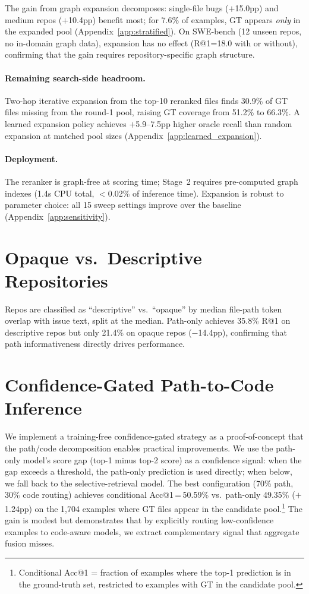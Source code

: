 \documentclass{article}
\begin{document}
The gain from graph expansion decomposes: single-file bugs ($+$15.0pp) and medium repos ($+$10.4pp) benefit most; for 7.6\% of examples, GT appears \emph{only} in the expanded pool (Appendix~\ref{app:stratified}).
On SWE-bench (12 unseen repos, no in-domain graph data), expansion has no effect (R@1=18.0 with or without), confirming that the gain requires repository-specific graph structure.

\paragraph{Remaining search-side headroom.}
Two-hop iterative expansion from the top-10 reranked files finds 30.9\% of GT files missing from the round-1 pool, raising GT coverage from 51.2\% to 66.3\%.
A learned expansion policy achieves $+$5.9--7.5pp higher oracle recall than random expansion at matched pool sizes (Appendix~\ref{app:learned_expansion}).

\paragraph{Deployment.}
The reranker is graph-free at scoring time; Stage~2 requires pre-computed graph indexes (1.4s CPU total, $<$0.02\% of inference time).
Expansion is robust to parameter choice: all 15 sweep settings improve over the baseline (Appendix~\ref{app:sensitivity}).


\section{Opaque vs.\ Descriptive Repositories}
\label{app:opaque_descriptive}

Repos are classified as ``descriptive'' vs.\ ``opaque'' by median file-path token overlap with issue text, split at the median.
Path-only achieves 35.8\% R@1 on descriptive repos but only 21.4\% on opaque repos ($-$14.4pp), confirming that path informativeness directly drives performance.

\section{Confidence-Gated Path-to-Code Inference}
\label{app:confidence_gated}

We implement a training-free confidence-gated strategy as a proof-of-concept that the path/code decomposition enables practical improvements.
We use the path-only model's score gap (top-1 minus top-2 score) as a confidence signal: when the gap exceeds a threshold, the path-only prediction is used directly; when below, we fall back to the selective-retrieval model.
The best configuration (70\% path, 30\% code routing) achieves conditional Acc@1\,=\,50.59\% vs.\ path-only 49.35\% ($+$1.24pp) on the 1,704 examples where GT files appear in the candidate pool.\footnote{Conditional Acc@1 = fraction of examples where the top-1 prediction is in the ground-truth set, restricted to examples with GT in the candidate pool.}
The gain is modest but demonstrates that by explicitly routing low-confidence examples to code-aware models, we extract complementary signal that aggregate fusion misses.
\end{document}
